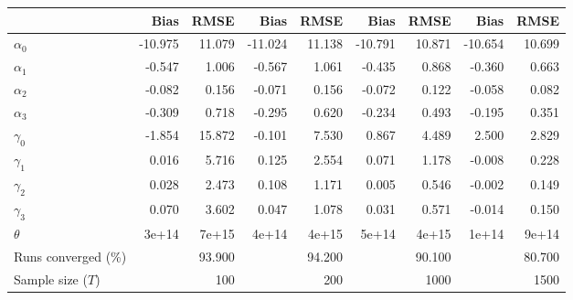 
\begin{tabular}[t]{lrrrrrrrr}
\toprule
  & Bias & RMSE & Bias & RMSE & Bias & RMSE & Bias & RMSE\\
\midrule
$\alpha_{0}$ & -10.975 & 11.079 & -11.024 & 11.138 & -10.791 & 10.871 & -10.654 & 10.699\\
$\alpha_{1}$ & -0.547 & 1.006 & -0.567 & 1.061 & -0.435 & 0.868 & -0.360 & 0.663\\
$\alpha_{2}$ & -0.082 & 0.156 & -0.071 & 0.156 & -0.072 & 0.122 & -0.058 & 0.082\\
$\alpha_{3}$ & -0.309 & 0.718 & -0.295 & 0.620 & -0.234 & 0.493 & -0.195 & 0.351\\
$\gamma_{0}$ & -1.854 & 15.872 & -0.101 & 7.530 & 0.867 & 4.489 & 2.500 & 2.829\\
$\gamma_{1}$ & 0.016 & 5.716 & 0.125 & 2.554 & 0.071 & 1.178 & -0.008 & 0.228\\
$\gamma_{2}$ & 0.028 & 2.473 & 0.108 & 1.171 & 0.005 & 0.546 & -0.002 & 0.149\\
$\gamma_{3}$ & 0.070 & 3.602 & 0.047 & 1.078 & 0.031 & 0.571 & -0.014 & 0.150\\
$\theta$ & 3e+14 & 7e+15 & 4e+14 & 4e+15 & 5e+14 & 4e+15 & 1e+14 & 9e+14\\
Runs converged (\%) &  & 93.900 &  & 94.200 &  & 90.100 &  & 80.700\\
Sample size ($T$) &  & 100 &  & 200 &  & 1000 &  & 1500\\
\bottomrule
\end{tabular}
